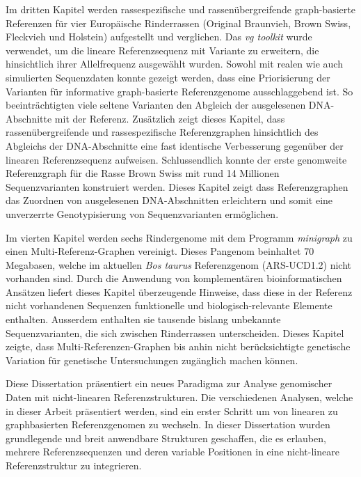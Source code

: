 \documentclass[11 pt, a4paper, notitlepage, twoside]{report}
\begin{document}
Im dritten Kapitel werden rassespezifische und rassenübergreifende graph-basierte Referenzen für vier Europäische Rinderrassen (Original Braunvieh, Brown Swiss, Fleckvieh und Holstein) aufgestellt und verglichen. Das \emph{vg toolkit} wurde verwendet, um die lineare Referenzsequenz mit Variante zu erweitern, die hinsichtlich ihrer Allelfrequenz ausgewählt wurden. Sowohl mit realen wie auch simulierten Sequenzdaten konnte gezeigt werden, dass eine Priorisierung der Varianten für informative graph-basierte Referenzgenome ausschlaggebend ist. So beeinträchtigten viele seltene Varianten den Abgleich der ausgelesenen DNA-Abschnitte mit der Referenz. Zusätzlich zeigt dieses Kapitel, dass rassenübergreifende und rassespezifische Referenzgraphen hinsichtlich des Abgleichs der DNA-Abschnitte eine fast identische Verbesserung gegenüber der linearen Referenzsequenz aufweisen. Schlussendlich konnte der erste genomweite Referenzgraph für die Rasse Brown Swiss mit rund 14 Millionen Sequenzvarianten konstruiert werden. Dieses Kapitel zeigt dass Referenzgraphen das Zuordnen von ausgelesenen DNA-Abschnitten erleichtern und somit eine unverzerrte Genotypisierung von Sequenzvarianten ermöglichen.

\thispagestyle{plain}

Im vierten Kapitel werden sechs Rindergenome mit dem Programm \emph{minigraph} zu einen Multi-Referenz-Graphen vereinigt. Dieses Pangenom beinhaltet 70 Megabasen, welche im aktuellen \emph{Bos taurus} Referenzgenom (ARS-UCD1.2) nicht vorhanden sind. Durch die Anwendung von komplementären bioinformatischen Ansätzen liefert dieses Kapitel überzeugende Hinweise, dass diese in der Referenz nicht vorhandenen Sequenzen funktionelle und biologisch-relevante Elemente enthalten. Ausserdem enthalten sie tausende bislang unbekannte Sequenzvarianten, die  sich zwischen  Rinderrassen  unterscheiden. Dieses Kapitel zeigte, dass Multi-Referenzen-Graphen bis anhin nicht berücksichtigte genetische Variation für genetische Untersuchungen zugänglich machen können.

Diese Dissertation präsentiert ein neues Paradigma zur Analyse genomischer Daten mit nicht-linearen Referenzstrukturen. Die verschiedenen Analysen, welche in dieser Arbeit präsentiert werden, sind ein erster Schritt um von linearen zu graphbasierten Referenzgenomen zu wechseln. In dieser Dissertation wurden grundlegende und breit anwendbare Strukturen geschaffen, die es erlauben, mehrere Referenzsequenzen und deren variable Positionen in eine nicht-lineare Referenzstruktur zu integrieren.
\end{document}
